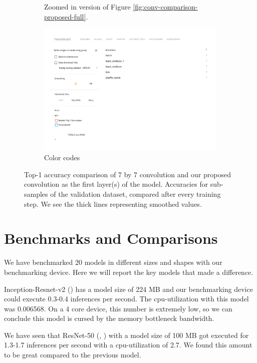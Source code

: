 \begin{figure}
\begin{subfigure}{.79\textwidth}
        \caption{Zoomed in version of Figure \ref{fig:conv-comparison-proposed-full}.}
  \end{subfigure}
  \begin{subfigure}{.49\textwidth}
        \includegraphics[width=1\linewidth]{images/proposed_conv_legend.pdf}
        \caption{Color codes}
  \end{subfigure}
  \caption{Top-1 accuracy comparison of 7 by 7 convolution and our proposed convolution as the first layer(s) of the model. Accuracies for sub-samples of the validation dataset, compared after every training step. We see the thick lines representing smoothed values.}
  \label{fig:proposed-comparison}
\end{figure}

\section{Benchmarks and Comparisons}
We have benchmarked 20 models in different sizes and shapes with our benchmarking device. Here we will report the key models that made a difference.

Inception-Resnet-v2 (\cite{DBLP:journals/corr/SzegedyIV16}) has a model size of 224 MB and our benchmarking device could execute 0.3-0.4 inferences per second. The cpu-utilization with this model was 0.006568. On a 4 core device, this number is extremely low, so we can conclude this model is cursed by the memory bottleneck bandwidth. 

We have seen that ResNet-50 (\cite{He:2015aa}, \cite{he2016identity}) with a model size of 100 MB got executed for 1.3-1.7 inferences per second with a cpu-utilization of 2.7. We found this amount to be great compared to the previous model.  

